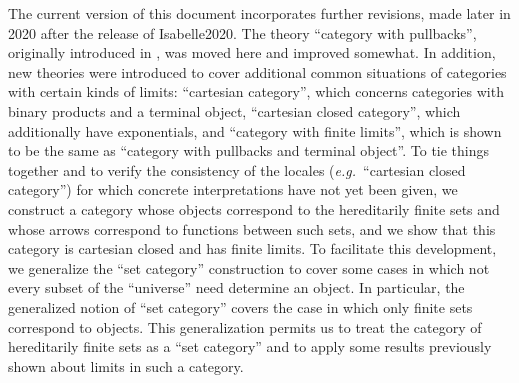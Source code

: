 \documentclass[11pt,notitlepage,a4paper]{report}
\begin{document}
The current version of this document incorporates further revisions, made later in 2020
after the release of Isabelle2020.  The theory ``category with pullbacks'',
originally introduced in \cite{Bicategory-AFP}, was moved here and improved somewhat.
In addition, new theories were introduced to cover additional common
situations of categories with certain kinds of limits:
``cartesian category'', which concerns categories with binary products and a terminal object,
``cartesian closed category'', which additionally have exponentials, and
``category with finite limits'', which is shown to be the same as
``category with pullbacks and terminal object''.
To tie things together and to verify the consistency of the locales
(\emph{e.g.}~``cartesian closed category'') for which concrete interpretations have not yet
been given, we construct a category whose objects correspond to the hereditarily finite sets
and whose arrows correspond to functions between such sets, and we show that this category
is cartesian closed and has finite limits.
To facilitate this development, we generalize the ``set category'' construction to cover
some cases in which not every subset of the ``universe'' need determine an object.
In particular, the generalized notion of ``set category'' covers the case in which only
finite sets correspond to objects.  This generalization permits us to treat the category
of hereditarily finite sets as a ``set category'' and to apply some results previously shown
about limits in such a category.





\end{document}
